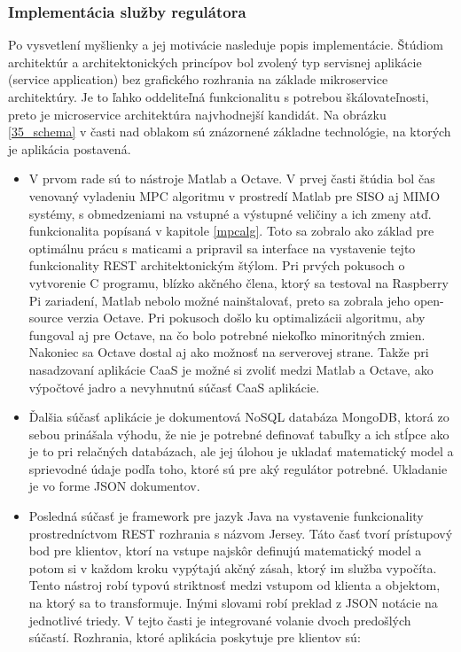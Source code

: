 \subsubsection{Implementácia služby regulátora} \label{seccaas}
Po vysvetlení myšlienky a jej motivácie nasleduje popis implementácie. Štúdiom architektúr a architektonických princípov bol zvolený typ servisnej aplikácie (service application) bez grafického rozhrania na základe mikroservice architektúry. Je to ľahko oddeliteľná funkcionalitu s potrebou škálovateľnosti, preto je microservice architektúra najvhodnejší kandidát. Na obrázku \ref{35_schema} v časti nad oblakom sú znázornené základne technológie, na ktorých je aplikácia postavená.
\begin{itemize}
  \item V prvom rade sú to nástroje Matlab a Octave. V prvej časti štúdia bol čas venovaný vyladeniu MPC algoritmu v prostredí Matlab pre SISO aj MIMO systémy, s obmedzeniami na vstupné a výstupné veličiny a ich zmeny atď. funkcionalita popísaná v  kapitole \ref{mpcalg}. Toto sa zobralo ako základ pre optimálnu prácu s maticami a pripravil sa interface na vystavenie tejto funkcionality REST architektonickým štýlom. Pri prvých pokusoch o vytvorenie C programu, blízko akčného člena, ktorý sa testoval na Raspberry Pi zariadení, Matlab nebolo možné nainštalovať, preto sa zobrala jeho open-source verzia Octave. Pri pokusoch došlo ku optimalizácii algoritmu, aby fungoval aj pre Octave, na čo bolo potrebné niekoľko minoritných zmien. Nakoniec sa Octave dostal aj ako možnosť na serverovej strane. Takže pri nasadzovaní aplikácie CaaS je možné si zvoliť medzi Matlab a Octave, ako výpočtové jadro a nevyhnutnú súčasť CaaS aplikácie.
  \item Ďalšia súčasť aplikácie je dokumentová NoSQL databáza MongoDB, ktorá zo sebou prinášala výhodu, že nie je potrebné definovať tabuľky a ich stĺpce ako je to pri relačných databázach, ale jej úlohou je ukladať matematický model a sprievodné údaje podľa toho, ktoré sú pre aký regulátor potrebné. Ukladanie je vo forme JSON dokumentov.
  \item Posledná súčasť je framework pre jazyk Java na vystavenie funkcionality prostredníctvom REST rozhrania s názvom Jersey. Táto časť tvorí prístupový bod pre klientov, ktorí na vstupe najskôr definujú matematický model a potom si v každom kroku vypýtajú akčný zásah, ktorý im služba vypočíta. Tento nástroj robí typovú striktnosť medzi vstupom od klienta a objektom, na ktorý sa to transformuje. Inými slovami robí preklad z JSON notácie na jednotlivé triedy. V tejto časti je integrované volanie dvoch predošlých súčastí. Rozhrania, ktoré aplikácia poskytuje pre klientov sú:

\end{itemize}
